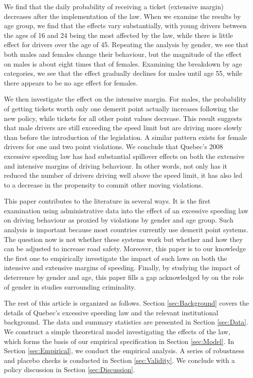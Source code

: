 We find that the daily probability of receiving a ticket (extensive margin) 
decreases after the implementation of the law. 
When we examine the results by age group, we find that the effects vary substantially, 
with young drivers between the ages of 16 and 24 being the most affected by the law, 
while there is little effect for drivers over the age of 45. 
Repeating the analysis by gender, we see that both males and females change their behaviour, 
but the magnitude of the effect on males is about eight times that of females. 
Examining the breakdown by age categories, we see that the effect gradually declines 
for males until age 55, while there appears to be no age effect for females. 

We then investigate the effect on the intensive margin. 
For males, the probability of getting tickets worth only one demerit point 
actually increases following the new policy, while tickets for all other point values decrease. 
This result suggests that male drivers are still exceeding the speed limit 
but are driving more slowly than before the introduction of the legislation. 
A similar pattern exists for female drivers for one and two point violations. 
%
We conclude that Quebec’s 2008 excessive speeding law has had substantial spillover effects 
on both the extensive and intensive margins of driving behaviour. 
In other words, not only has it reduced the number of drivers driving well above the speed limit, 
it has also led to a decrease in the propensity to commit other moving violations.

This paper contributes to the literature in several ways. 
It is the first examination using administrative data into the effect of 
an excessive speeding law on driving behaviour 
as proxied by violations by gender and age group. 
Such analysis is important because most countries currently use demerit point systems. 
The question now is not whether these systems work 
but whether and how they can be adjusted to increase road safety. 
Moreover, this paper is to our knowledge the first one to empirically investigate 
the impact of such laws on both the intensive and extensive margins of speeding. 
Finally, by studying the impact of deterrence by gender and age, 
this paper fills a gap acknowledged by 
\citet{freeman1999}
on the role of gender in studies surrounding criminality.


The rest of this article is organized as follows. 
Section \ref{sec:Background} covers the details of Quebec’s excessive speeding law 
and the relevant institutional background. 
The data and summary statistics are presented in Section \ref{sec:Data}. 
% 
We construct a simple theoretical model investigating the effects of the law,
which forms the basis of our empirical specification in Section \ref{sec:Model}. 
% 
In Section \ref{sec:Empirical}, we conduct the empirical analysis. 
A series of robustness and placebo checks is conducted in Section \ref{sec:Validity}. 
We conclude with a policy discussion in Section \ref{sec:Discussion}.

